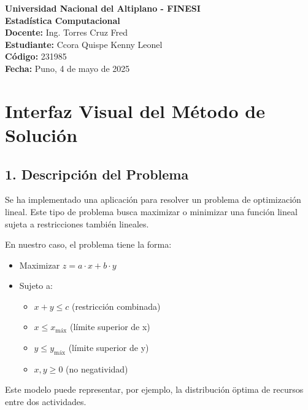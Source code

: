 \documentclass[a4paper,10pt]{article}
\begin{document}
\begin{center}
    \textbf{\Large Universidad Nacional del Altiplano - FINESI} \\[1em]
    \textbf{\large Estadística Computacional} \\[1em]
    
    \textbf{Docente:} Ing. Torres Cruz Fred \\
    \textbf{Estudiante:} Ccora Quispe Kenny Leonel \\
    \textbf{Código:} 231985 \\[2em]
    
    \textbf{Fecha:} Puno, 4 de mayo de 2025
\end{center}

\vspace{1em} 


\section*{Interfaz Visual del M\'etodo de Soluci\'on}

\subsection*{1. Descripci\'on del Problema}
Se ha implementado una aplicaci\'on para resolver un problema de optimizaci\'on lineal. Este tipo de problema busca maximizar o minimizar una funci\'on lineal sujeta a restricciones tambi\'en lineales.

En nuestro caso, el problema tiene la forma:
\begin{itemize}
  \item Maximizar $z = a \cdot x + b \cdot y$
  \item Sujeto a:
  \begin{itemize}
    \item $x + y \leq c$ (restricci\'on combinada)
    \item $x \leq x_{\text{m\'ax}}$ (l\'imite superior de x)
    \item $y \leq y_{\text{m\'ax}}$ (l\'imite superior de y)
    \item $x, y \geq 0$ (no negatividad)
  \end{itemize}
\end{itemize}
Este modelo puede representar, por ejemplo, la distribuci\'on \"optima de recursos entre dos actividades.
\end{document}

